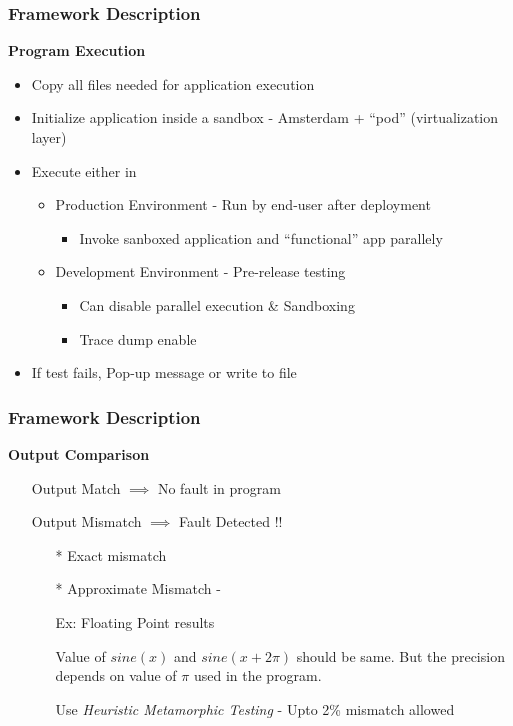 \documentclass[compress,red]{beamer}
\begin{document}
\frame
{
	\frametitle{Framework Description}
	\textbf{Program Execution}
	\begin{itemize}
		\pause
		\item Copy all files needed for application execution
		\pause	
		\item Initialize application inside a sandbox - Amsterdam + ``pod'' (virtualization layer)
		\pause
		\item Execute either in 
			\begin{itemize}
				\pause
				\item Production Environment - Run by end-user after deployment
					\begin{itemize}
						\item Invoke sanboxed application and ``functional'' app parallely
					\end{itemize}
				\pause
				\item Development Environment - Pre-release testing
					\begin{itemize}
						\item Can disable parallel execution \& Sandboxing
						\item Trace dump enable
					\end{itemize}
			\end{itemize}
		\pause
		\item If test fails, Pop-up message or write to file
	\end{itemize}
}

\frame
{
	\frametitle{Framework Description}
	\textbf{Output Comparison}
	\begin{itemize}
		\item[] Output Match $\implies$ No fault in program
		\item[] Output Mismatch $\implies$ Fault Detected !!
			\begin{itemize}
				\pause
				\item[*] Exact mismatch
				\pause
				\item[*] Approximate Mismatch - 
				\item[] Ex: Floating Point results
				\item[] Value of $sine(x)$ and $sine(x + 2\pi)$ should be same. But the precision depends on value of $\pi$ used in the program.
				\pause
				\item[]
				\item[] Use \textit{Heuristic Metamorphic Testing} - Upto 2\% mismatch allowed
			\end{itemize}
	\end{itemize}
}
\end{document}
